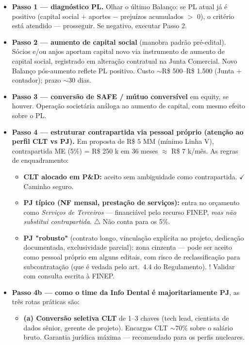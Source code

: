 \documentclass[11pt, a4paper]{article}
\begin{document}
\begin{itemize}[label=\textcolor{accentColor}{$\blacktriangleright$}, leftmargin=1.6em]
    \item \textbf{Passo 1 --- diagnóstico PL.} Olhar o último Balanço: se PL atual já é positivo (capital social $+$ aportes $-$ prejuízos acumulados $>$ 0), o critério está atendido --- prosseguir. Se negativo, executar Passo 2.
    \item \textbf{Passo 2 --- aumento de capital social} (manobra padrão pré-edital). Sócios e/ou anjos aportam capital novo via instrumento de aumento de capital social, registrado em alteração contratual na Junta Comercial. Novo Balanço pós-aumento reflete PL positivo. Custo $\sim$R\$ 500--R\$ 1.500 (Junta + contador); prazo $\sim$30 dias.
    \item \textbf{Passo 3 --- conversão de SAFE / mútuo conversível} em equity, se houver. Operação societária análoga ao aumento de capital, com mesmo efeito sobre o PL.
    \item \textbf{Passo 4 --- estruturar contrapartida via pessoal próprio (atenção ao perfil CLT vs PJ).} Em proposta de R\$ 5 MM (mínimo Linha V), contrapartida ME (5\%) = R\$ 250 k em 36 meses $\approx$ R\$ 7 k/mês. As regras de enquadramento:
    \begin{itemize}[label=$\circ$, leftmargin=1.4em]
        \item \textbf{CLT alocado em P\&D:} aceito sem ambiguidade como contrapartida. \textcolor{successGreen}{$\checkmark$ Caminho seguro.}
        \item \textbf{PJ típico (NF mensal, prestação de serviços):} entra no orçamento como \emph{Serviços de Terceiros} --- financiável pelo recurso FINEP, \emph{mas não substitui contrapartida}. \textcolor{warningOrange}{$\triangle$ Não conta para os 5\%.}
        \item \textbf{PJ "robusto"} (contrato longo, vinculação explícita ao projeto, dedicação documentada, exclusividade parcial): zona cinzenta --- pode ser aceito como pessoal próprio em alguns editais, com risco de reclassificação para subcontratação (que é vedada pelo art.\ 4.4 do Regulamento). \textcolor{accentColor}{$!$ Validar com consulta escrita à FINEP.}
    \end{itemize}
    \item \textbf{Passo 4b --- como o time da Info Dental é majoritariamente PJ}, as três rotas práticas são:
    \begin{itemize}[label=$\circ$, leftmargin=1.4em]
        \item \textbf{(a) Conversão seletiva CLT} de 1--3 chaves (tech lead, cientista de dados sênior, gerente de projeto). Encargos CLT $\sim$70\% sobre o salário bruto. Garantia jurídica máxima --- recomendado para os perfis nucleares.

\end{itemize}
\end{itemize}
\end{document}
